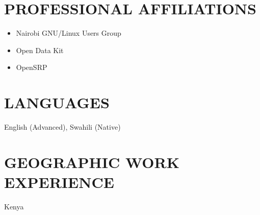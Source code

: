 \documentclass{res}
\begin{document}
\begin{resume}
	\section{PROFESSIONAL AFFILIATIONS}
	\begin{itemize} \itemsep -2pt
		\item Nairobi GNU/Linux Users Group
		\item Open Data Kit
		\item OpenSRP
	\end{itemize}

	\section{LANGUAGES}
	\begin{itemize} \itemsep -2pt
		      \vspace{8pt}
		      English (Advanced), Swahili (Native)
	\end{itemize}

	\section{GEOGRAPHIC WORK EXPERIENCE}
	\begin{itemize} \itemsep -2pt
		      \vspace{8pt}
		      Kenya
	\end{itemize}

\end{resume}
\end{document}

